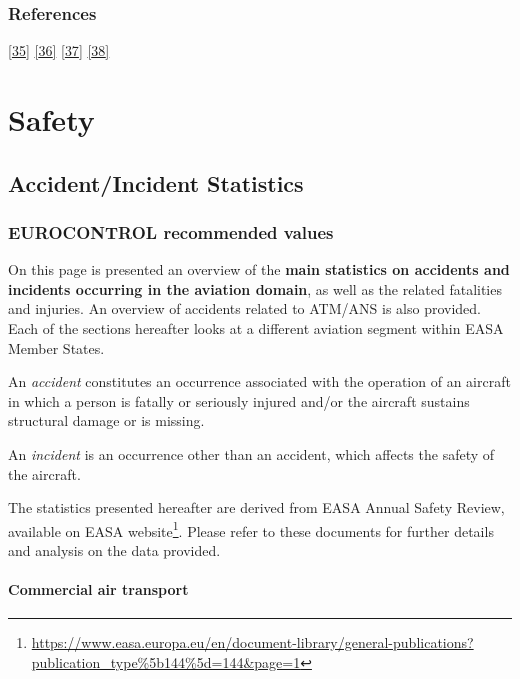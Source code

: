\documentclass[
  11pt,
  a4paper,
]{book}
\DeclareRobustCommand{\href}[2]{#2\footnote{\url{#1}}}
\begin{document}
\hypertarget{references-15}{%
\section{References}\label{references-15}}

\protect\hyperlink{ref-itf:2019}{{[}35{]}}
\protect\hyperlink{ref-passtimevalue2015}{{[}36{]}}
\protect\hyperlink{ref-leedsuniversity2016}{{[}37{]}}
\protect\hyperlink{ref-leedsuniversity2012}{{[}38{]}}

\part{Safety}

\hypertarget{sec-accident-incident-statistics}{%
\chapter{Accident/Incident
Statistics}\label{sec-accident-incident-statistics}}

\hypertarget{eurocontrol-recommended-values-16}{%
\section{EUROCONTROL recommended
values}\label{eurocontrol-recommended-values-16}}

On this page is presented an overview of the \textbf{main statistics on
accidents and incidents occurring in the aviation domain}, as well as
the related fatalities and injuries. An overview of accidents related to
ATM/ANS is also provided. Each of the sections hereafter looks at a
different aviation segment within EASA Member States.

An \emph{accident} constitutes an occurrence associated with the
operation of an aircraft in which a person is fatally or seriously
injured and/or the aircraft sustains structural damage or is missing.

An \emph{incident} is an occurrence other than an accident, which
affects the safety of the aircraft.

The statistics presented hereafter are derived from EASA Annual Safety
Review, available on
\href{https://www.easa.europa.eu/en/document-library/general-publications?publication_type\%5b144\%5d=144\&page=1}{EASA
website}. Please refer to these documents for further details and
analysis on the data provided.

\hypertarget{commercial-air-transport}{%
\subsection{Commercial air transport}\label{commercial-air-transport}}
\end{document}

